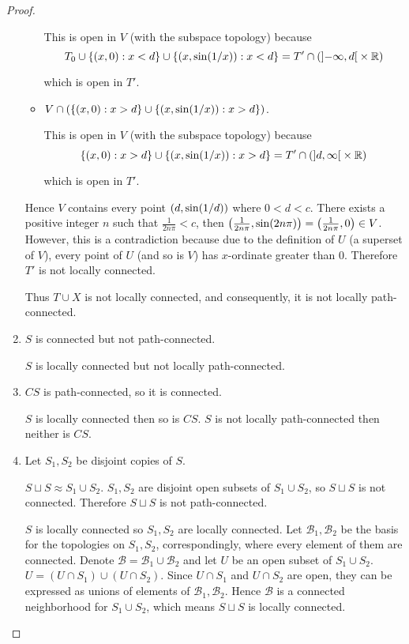 \begin{proof}
\begin{enumerate}[label={(\alph*)}]
\begin{itemize}
			            This is open in $V$ (with the subspace topology) because
			            \begin{equation*}
				            T_{0} \cup \left\{{ \left({x,0}\right) : x < d }\right\} \cup \left\{{ \left({x, \sin(1/x)}\right) : x < d }\right\} = T' \cap (\left]{-\infty, d}\right[ \times\mathbb{R})
			            \end{equation*}

			            which is open in $T'$.
			      \item $V \cap (\left\{{\left({x,0}\right) : x > d}\right\} \cup \left\{{ \left({x, \sin(1/x)}\right) : x > d }\right\})$.

			            This is open in $V$ (with the subspace topology) because
			            \begin{equation*}
				            \left\{{\left({x,0}\right) : x > d}\right\} \cup \left\{{ \left({x, \sin(1/x)}\right) : x > d }\right\} = T' \cap (\left]{d, \infty}\right[ \times\mathbb{R})
			            \end{equation*}

			            which is open in $T'$.
		      \end{itemize}

		      Hence $V$ contains every point $\left({d, \sin(1/d)}\right)$ where $0 < d < c$. There exists a positive integer $n$ such that $\frac{1}{2n\pi} < c$, then $\left({\frac{1}{2n\pi}, \sin(2n\pi)}\right) = \left({\frac{1}{2n\pi}, 0}\right) \in V$. However, this is a contradiction because due to the definition of $U$ (a superset of $V$), every point of $U$ (and so is $V$) has $x$-ordinate greater than 0. Therefore $T'$ is not locally connected.

		      Thus $T\cup X$ is not locally connected, and consequently, it is not locally path-connected.
		\item $S$ is connected but not path-connected.

		      $S$ is locally connected but not locally path-connected.
		\item $CS$ is path-connected, so it is connected.

		      $S$ is locally connected then so is $CS$. $S$ is not locally path-connected then neither is $CS$.
		\item Let $S_{1}, S_{2}$ be disjoint copies of $S$.

		      $S\sqcup S \approx S_{1}\cup S_{2}$. $S_{1}, S_{2}$ are disjoint open subsets of $S_{1}\cup S_{2}$, so $S\sqcup S$ is not connected. Therefore $S\sqcup S$ is not path-connected.

		      $S$ is locally connected so $S_{1}, S_{2}$ are locally connected. Let $\mathscr{B}_{1}, \mathscr{B}_{2}$ be the basis for the topologies on $S_{1}, S_{2}$, correspondingly, where every element of them are connected. Denote $\mathscr{B} = \mathscr{B}_{1} \cup \mathscr{B}_{2}$ and let $U$ be an open subset of $S_{1}\cup S_{2}$. $U = (U\cap S_{1}) \cup (U\cap S_{2})$. Since $U\cap S_{1}$ and $U\cap S_{2}$ are open, they can be expressed as unions of elements of $\mathscr{B}_{1}, \mathscr{B}_{2}$. Hence $\mathscr{B}$ is a connected neighborhood for $S_{1}\cup S_{2}$, which means $S\sqcup S$ is locally connected.


\end{enumerate}
\end{proof}
